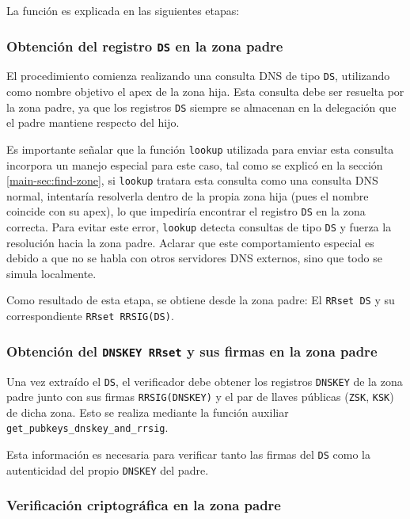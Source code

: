 La función es explicada en las siguientes etapas:

\subsubsection{Obtención del registro \texttt{DS} en la zona padre}

El procedimiento comienza realizando una consulta DNS de tipo \texttt{DS}, utilizando como nombre objetivo el apex de la zona hija. Esta consulta debe ser resuelta por la zona padre, 
ya que los registros \texttt{DS} siempre se almacenan en la delegación que el padre mantiene respecto del hijo.

Es importante señalar que la función \texttt{lookup} utilizada para enviar esta consulta incorpora un manejo especial para este caso,
tal como se explicó en la sección \ref{main-sec:find-zone}, si \texttt{lookup} tratara esta consulta como una consulta DNS normal, intentaría resolverla dentro de la propia zona hija 
(pues el nombre coincide con su apex), lo que impediría encontrar el registro \texttt{DS} en la zona correcta. Para evitar este error, \texttt{lookup} detecta consultas de tipo \texttt{DS} y 
fuerza la resolución hacia la zona padre. Aclarar que este comportamiento especial es debido a que no se habla con otros servidores DNS externos, sino que todo se simula localmente.

Como resultado de esta etapa, se obtiene desde la zona padre: El \texttt{RRset DS} y su correspondiente \texttt{RRset RRSIG(DS)}.

\subsubsection{Obtención del \texttt{DNSKEY RRset} y sus firmas en la zona padre}

Una vez extraído el \texttt{DS}, el verificador debe obtener los registros \texttt{DNSKEY} de la zona padre junto con sus firmas \texttt{RRSIG(DNSKEY)} y el par de llaves públicas 
(\texttt{ZSK}, \texttt{KSK}) de dicha zona. Esto se realiza mediante la función auxiliar \texttt{get\_pubkeys\_dnskey\_and\_rrsig}.

Esta información es necesaria para verificar tanto las firmas del \texttt{DS} como la autenticidad del propio \texttt{DNSKEY} del padre.

\subsubsection{Verificación criptográfica en la zona padre}

